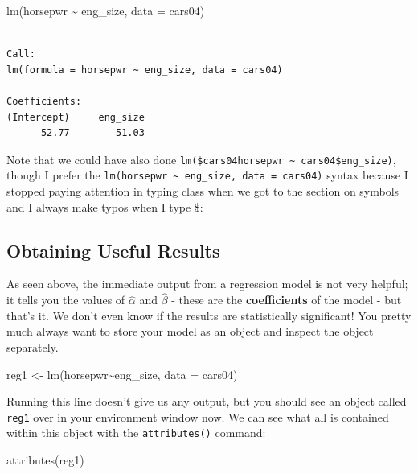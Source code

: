 \documentclass[
  letterpaper,
]{book}
\newenvironment{Shaded}{\begin{snugshade}}{\end{snugshade}}
\newcommand{\AttributeTok}[1]{\textcolor[rgb]{0.40,0.45,0.13}{#1}}
\newcommand{\FunctionTok}[1]{\textcolor[rgb]{0.28,0.35,0.67}{#1}}
\newcommand{\NormalTok}[1]{\textcolor[rgb]{0.00,0.23,0.31}{#1}}
\newcommand{\OtherTok}[1]{\textcolor[rgb]{0.00,0.23,0.31}{#1}}
\newcommand{\SpecialCharTok}[1]{\textcolor[rgb]{0.37,0.37,0.37}{#1}}
\begin{document}
\begin{Shaded}
\begin{Highlighting}[]
\FunctionTok{lm}\NormalTok{(horsepwr }\SpecialCharTok{\textasciitilde{}}\NormalTok{ eng\_size, }\AttributeTok{data =}\NormalTok{ cars04)}
\end{Highlighting}
\end{Shaded}

\begin{verbatim}

Call:
lm(formula = horsepwr ~ eng_size, data = cars04)

Coefficients:
(Intercept)     eng_size  
      52.77        51.03  
\end{verbatim}

Note that we could have also done
\texttt{lm(\$cars04horsepwr\ \textasciitilde{}\ cars04\$eng\_size)},
though I prefer the
\texttt{lm(horsepwr\ \textasciitilde{}\ eng\_size,\ data\ =\ cars04)}
syntax because I stopped paying attention in typing class when we got to
the section on symbols and I always make typos when I type \$:

\subsection{Obtaining Useful Results}\label{obtaining-useful-results}

As seen above, the immediate output from a regression model is not very
helpful; it tells you the values of \(\hat{\alpha}\) and \(\hat{\beta}\)
- these are the \textbf{coefficients} of the model - but that's it. We
don't even know if the results are statistically significant! You pretty
much always want to store your model as an object and inspect the object
separately.

\begin{Shaded}
\begin{Highlighting}[]
\NormalTok{reg1 }\OtherTok{\textless{}{-}} \FunctionTok{lm}\NormalTok{(horsepwr}\SpecialCharTok{\textasciitilde{}}\NormalTok{eng\_size, }\AttributeTok{data =}\NormalTok{ cars04)}
\end{Highlighting}
\end{Shaded}

Running this line doesn't give us any output, but you should see an
object called \texttt{reg1} over in your environment window now. We can
see what all is contained within this object with the
\texttt{attributes()} command:

\begin{Shaded}
\begin{Highlighting}[]
\FunctionTok{attributes}\NormalTok{(reg1)}
\end{Highlighting}
\end{Shaded}
\end{document}
